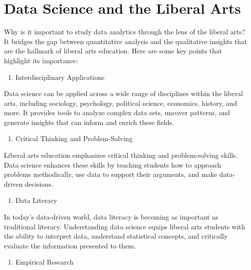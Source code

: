 \documentclass[
  letterpaper,
  DIV=11,
  numbers=noendperiod]{scrreprt}
\providecommand{\tightlist}{%
  \setlength{\itemsep}{0pt}\setlength{\parskip}{0pt}}\usepackage{longtable,booktabs,array}
\begin{document}
\section*{Data Science and the Liberal
Arts}\label{data-science-and-the-liberal-arts}


Why is it important to study data analytics through the lens of the
liberal arts? It bridges the gap between quantitative analysis and the
qualitative insights that are the hallmark of liberal arts education.
Here are some key points that highlight its importance:

\begin{enumerate}
\def\labelenumi{\arabic{enumi}.}
\tightlist
\item
  Interdisciplinary Applications
\end{enumerate}

Data science can be applied across a wide range of disciplines within
the liberal arts, including sociology, psychology, political science,
economics, history, and more. It provides tools to analyze complex data
sets, uncover patterns, and generate insights that can inform and enrich
these fields.

\begin{enumerate}
\def\labelenumi{\arabic{enumi}.}
\setcounter{enumi}{1}
\tightlist
\item
  Critical Thinking and Problem-Solving
\end{enumerate}

Liberal arts education emphasizes critical thinking and problem-solving
skills. Data science enhances these skills by teaching students how to
approach problems methodically, use data to support their arguments, and
make data-driven decisions.

\begin{enumerate}
\def\labelenumi{\arabic{enumi}.}
\setcounter{enumi}{2}
\tightlist
\item
  Data Literacy
\end{enumerate}

In today's data-driven world, data literacy is becoming as important as
traditional literacy. Understanding data science equips liberal arts
students with the ability to interpret data, understand statistical
concepts, and critically evaluate the information presented to them.

\begin{enumerate}
\def\labelenumi{\arabic{enumi}.}
\setcounter{enumi}{3}
\tightlist
\item
  Empirical Research
\end{enumerate}
\end{document}
